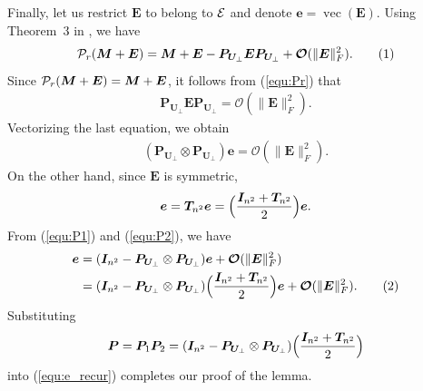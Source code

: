 \documentclass{article}
\def\P{{\cal P}}
\def\E{{\cal E}}
\newcommand{\norm}[1]{\|#1\|} %
\newcommand\numberthis{\addtocounter{equation}{1}\tag{\theequation}}
\DeclareMathOperator*{\vect}{vec}
\begin{document}
Finally, let us restrict $\bm E$ to belong to $\E$ and denote $\bm e = \vect (\bm E)$. Using Theorem~3 in \cite{vu2020perturbation}, we have
\begin{align*}
    \P_r (\bm M + \bm E) = \bm M + \bm E - \bm P_{\bm U_\perp} \bm E \bm P_{\bm U_\perp} + \bm{\mathcal{O}}(\norm{\bm E}_F^2) . \numberthis \label{equ:Pr}
\end{align*}
Since $\P_r (\bm M + \bm E) = \bm M + \bm E$, it follows from (\ref{equ:Pr}) that 
\begin{align*}
    \bm P_{\bm U_\perp} \bm E \bm P_{\bm U_\perp} = \bm{\mathcal{O}}(\norm{\bm E}_F^2) .
\end{align*}
Vectorizing the last equation, we obtain 
\begin{align} \label{equ:P1}
    (\bm P_{\bm U_\perp} \otimes \bm P_{\bm U_\perp}) \bm e = \bm{\mathcal{O}}(\norm{\bm E}_F^2) .
\end{align}
On the other hand, since $\bm E$ is symmetric,
\begin{align} \label{equ:P2}
    \bm e = \bm T_{n^2} \bm e = \Bigl( \frac{\bm I_{n^2} + \bm T_{n^2}}{2} \Bigr) \bm e .
\end{align}
From (\ref{equ:P1}) and (\ref{equ:P2}), we have
\begin{align*}
    \bm e &= (\bm I_{n^2} - \bm P_{\bm U_\perp} \otimes \bm P_{\bm U_\perp}) \bm e + \bm{\mathcal{O}}(\norm{\bm E}_F^2) \\
    &= (\bm I_{n^2} - \bm P_{\bm U_\perp} \otimes \bm P_{\bm U_\perp}) \Bigl( \frac{\bm I_{n^2} + \bm T_{n^2}}{2} \Bigr) \bm e + \bm{\mathcal{O}}(\norm{\bm E}_F^2) . \numberthis \label{equ:e_recur}
\end{align*}
Substituting 
$$\bm P = \bm P_1 \bm P_2 = (\bm I_{n^2} - \bm P_{\bm U_\perp} \otimes \bm P_{\bm U_\perp}) \Bigl( \frac{\bm I_{n^2} + \bm T_{n^2}}{2} \Bigr) $$
into (\ref{equ:e_recur}) completes our proof of the lemma.
\end{document}
